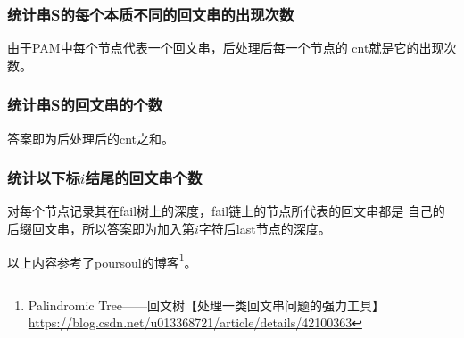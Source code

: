 \subsubsection{统计串S的每个本质不同的回文串的出现次数}
由于PAM中每个节点代表一个回文串，后处理后每一个节点的
cnt就是它的出现次数。
\subsubsection{统计串S的回文串的个数}
答案即为后处理后的cnt之和。
\subsubsection{统计以下标$i$结尾的回文串个数}
对每个节点记录其在fail树上的深度，fail链上的节点所代表的回文串都是
自己的后缀回文串，所以答案即为加入第$i$字符后last节点的深度。

以上内容参考了poursoul的博客\footnote{
    Palindromic Tree——回文树【处理一类回文串问题的强力工具】
    \url{https://blog.csdn.net/u013368721/article/details/42100363}
}。
